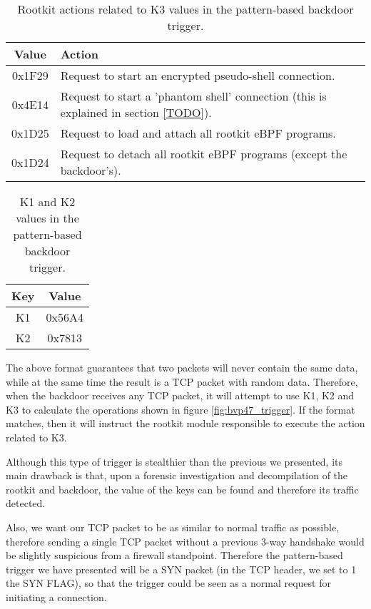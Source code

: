 \begin{table}[htbp]
\begin{tabular}{|c|>{\centering\arraybackslash}p{8cm}|}
\hline
Value & Action\\
\hline
\hline
0x1F29 & Request to start an encrypted pseudo-shell connection.\\
\hline
0x4E14 & Request to start a 'phantom shell' connection (this is explained in section \ref{TODO}).\\
\hline
0x1D25 & Request to load and attach all rootkit eBPF programs.\\
\hline
0x1D24 & Request to detach all rootkit eBPF programs (except the backdoor's).\\
\hline
\end{tabular}
\caption{Rootkit actions related to K3 values in the pattern-based backdoor trigger.}
\label{table:k3_values}
\end{table}

\begin{table}[htbp]
\begin{tabular}{|c|c|}
\hline
Key & Value\\
\hline
\hline
K1 & 0x56A4\\
\hline
K2 & 0x7813\\
\hline
\end{tabular}
\caption{K1 and K2 values in the pattern-based backdoor trigger.}
\label{table:k1_k2_values}
\end{table}

The above format guarantees that two packets will never contain the same data, while at the same time the result is a TCP packet with random data. Therefore, when the backdoor receives any TCP packet, it will attempt to use K1, K2 and K3 to calculate the operations shown in figure \ref{fig:bvp47_trigger}. If the format matches, then it will instruct the rootkit module responsible to execute the action related to K3.

Although this type of trigger is stealthier than the previous we presented, its main drawback is that, upon a forensic investigation and decompilation of the rootkit and backdoor, the value of the keys can be found and therefore its traffic detected. 

Also, we want our TCP packet to be as similar to normal traffic as possible, therefore sending a single TCP packet without a previous 3-way handshake would be slightly suspicious from a firewall standpoint. Therefore the pattern-based trigger we have presented will be a SYN packet (in the TCP header, we set to 1 the SYN FLAG), so that the trigger could be seen as a normal request for initiating a connection.

